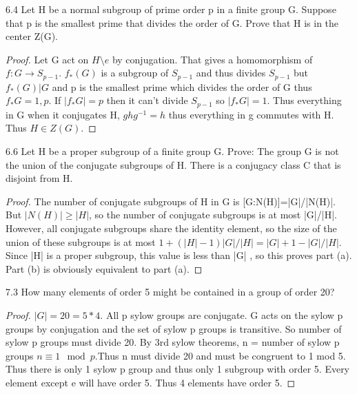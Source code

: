 \documentclass{article}
\begin{document}
\bigskip

\begin{PROB}{6.4}\label{Problem 6.4.}
    Let H be a normal subgroup of prime order p in a finite group G. Suppose that p is the smallest prime that divides the order of G. Prove that H is in the center Z(G).
\end{PROB}
\begin{proof}
    Let G act on $H \setminus {e}$ by conjugation. That gives a homomorphism of $f: G \to S_{p-1}$. $f_*(G)$ is a subgroup of $S_{p-1}$ and thus divides $S_{p-1}$ but $f_*(G) | G$ and p is the smallest prime which divides the order of G thus $f_*{G} = 1, p$. If $|f_*{G}| = p$ then it can't divide $S_{p-1}$ so $|f_*{G}| = 1$. Thus everything in G when it conjugates H, $ghg^{-1} = h$ thus everything in g commutes with H. Thus $H \in Z(G)$.
\end{proof}

\bigskip

\begin{PROB}{6.6}\label{Problem 6.6.}
    Let H be a proper subgroup of a finite group G. Prove: The group G is not the union of the conjugate subgroups of H. There is a conjugacy class C that is disjoint from H.
\end{PROB}
\begin{proof}
    The number of conjugate subgroups of H in G is [G:N(H)]=|G|/|N(H)|. But $|N(H)|\geq|H|$, so the number of conjugate subgroups is at most |G|/|H|. However, all conjugate subgroups share the identity element, so the size of the union of these subgroups is at most $1+(|H| - 1)|G|/|H|=|G|+1 - |G|/|H|$. Since |H| is a proper subgroup, this value is less than |G| , so this proves part (a). Part (b) is obviously equivalent to part (a).
\end{proof}

\begin{PROB}{7.3}\label{Problem 7.3.}
    How many elements of order 5 might be contained in a group of order 20?
\end{PROB}
\begin{proof}
    $|G| = 20 = 5 * 4$. All p sylow groups are conjugate. G acts on the sylow p groups by conjugation and the set of sylow p groups is transitive. So number of sylow p groups must divide 20. By 3rd sylow theorems, n = number of sylow p groups $n \equiv 1 \mod p$.Thus n must divide 20 and must be congruent to 1 mod 5. Thus there is only 1 sylow p group and thus only 1 subgroup with order 5. Every element except e will have order 5. Thus 4 elements have order 5. 
\end{proof}
\end{document}
